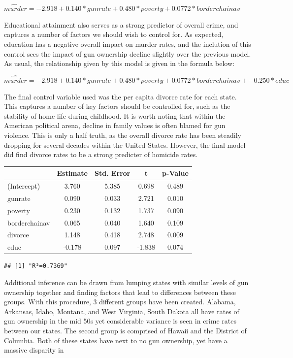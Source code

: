 \documentclass[floatsintext,mask,man]{apa6}
\theoremstyle{definition}
\theoremstyle{definition}
\theoremstyle{definition}
\theoremstyle{remark}
\begin{document}
\begin{center}
$\widehat{murder} = -2.918 + 0.140*\mathit{gunrate} + 0.480*\mathit{poverty} + 0.0772*\mathit{borderchainav}$
\end{center}

Educational attainment also serves as a strong predictor of overall
crime, and captures a number of factors we should wish to control for.
As expected, education has a negative overall impact on murder rates,
and the inclution of this control sees the impact of gun ownership
decline slightly over the previous model. As usual, the relationship
given by this model is given in the formula below:

\begin{center}
$\widehat{murder} = -2.918 + 0.140*\mathit{gunrate} + 0.480*\mathit{poverty} + 0.0772*\mathit{borderchainav} + -0.250*\mathit{educ}$
\end{center}

The final control variable used was the per capita divorce rate for each
state. This captures a number of key factors should be controlled for,
such as the stability of home life during childhood. It is worth noting
that within the American political arena, decline in family values is
often blamed for gun violence. This is only a half truth, as the overall
divorce rate has been steadily dropping for several decades within the
United States. However, the final model did find divorce rates to be a
strong predicter of homicide rates.

\begin{tabular}{l|c|c|c|c}
\hline
  & Estimate & Std. Error & t & p-Value\\
\hline
(Intercept) & 3.760 & 5.385 & 0.698 & 0.489\\
\hline
gunrate & 0.090 & 0.033 & 2.721 & 0.010\\
\hline
poverty & 0.230 & 0.132 & 1.737 & 0.090\\
\hline
borderchainav & 0.065 & 0.040 & 1.640 & 0.109\\
\hline
divorce & 1.148 & 0.418 & 2.748 & 0.009\\
\hline
educ & -0.178 & 0.097 & -1.838 & 0.074\\
\hline
\end{tabular}

\begin{verbatim}
## [1] "R²=0.7369"
\end{verbatim}

Additional inference can be drawn from lumping states with similar
levels of gun ownership together and finding factors that lead to
differences between these groups. With this procedure, 3 different
groups have been created. Alabama, Arkansas, Idaho, Montana, and West
Virginia, South Dakota all have rates of gun ownership in the mid 50s
yet considerable variance is seen in crime rates between our states. The
second group is comprised of Hawaii and the District of Columbia. Both
of these states have next to no gun ownership, yet have a massive
disparity in
\end{document}

